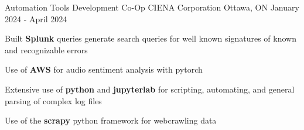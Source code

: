 \begin{cventries}
  \cventry
    {Automation Tools Development Co-Op} %
    {CIENA Corporation} %
    {Ottawa, ON} %
    {January 2024 - April 2024} %
    {
      \begin{cvitems} %
        \item {Built \textbf{Splunk} queries generate search queries for well known signatures of known and recognizable errors}
        \item {Use of \textbf{AWS} for audio sentiment analysis with pytorch}
        \item {Extensive use of \textbf{python} and \textbf{jupyterlab} for scripting, automating, and general parsing of complex log files}
        \item Use of the \textbf{scrapy} python framework for webcrawling data
      \end{cvitems}
    }


\end{cventries}

